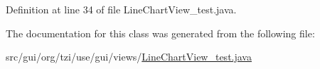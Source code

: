 Definition at line 34 of file Line\-Chart\-View\-\_\-test.\-java.



The documentation for this class was generated from the following file\-:\begin{DoxyCompactItemize}
\item 
src/gui/org/tzi/use/gui/views/\hyperlink{_line_chart_view__test_8java}{Line\-Chart\-View\-\_\-test.\-java}\end{DoxyCompactItemize}
